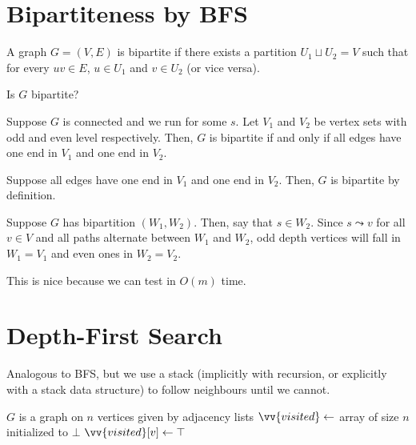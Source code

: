 \section{Bipartiteness by BFS}

\begin{defn}[bipartite]
  A graph $G = (V, E)$ is bipartite
  if there exists a partition $U_1 \sqcup U_2 = V$
  such that for every $uv \in E$, $u \in U_1$ and $v \in U_2$ (or vice versa).
\end{defn}

\begin{problem}
  Is $G$ bipartite?
\end{problem}

\begin{lemma}
  Suppose $G$ is connected and we run  for some $s$.
  Let $V_1$ and $V_2$ be vertex sets with odd and even level respectively.
  Then, $G$ is bipartite if and only if all edges have one end in $V_1$ and one end in $V_2$.
\end{lemma}
\begin{prf}
  Suppose all edges have one end in $V_1$ and one end in $V_2$.
  Then, $G$ is bipartite by definition.

  Suppose $G$ has bipartition $(W_1, W_2)$.
  Then, \Wlog say that $s \in W_2$.
  Since $s \leadsto v$ for all $v \in V$ and all paths alternate between $W_1$ and $W_2$,
  odd depth vertices will fall in $W_1 = V_1$ and even ones in $W_2 = V_2$.
\end{prf}

This is nice because we can test in $O(m)$ time.

\section{Depth-First Search}

Analogous to BFS, but we use a stack (implicitly with recursion,
or explicitly with a stack data structure) to follow neighbours until we cannot.

\begin{algorithm}[H]
  \caption{}
  \begin{algorithmic}[1]
    \Require $G$ is a graph on $n$ vertices given by adjacency lists
    \State $\vv{visited} \gets$ array of size $n$ initialized to $\bot$
      \State $\vv{visited}[v] \gets \top$
          \State {}
        \EndIf
      \EndFor
    \EndProcedure
        \State {}
      \EndIf
    \EndFor
  \end{algorithmic}
\end{algorithm}

